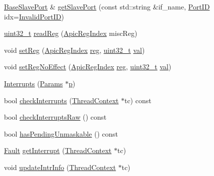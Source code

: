 \begin{DoxyCompactItemize}
\item 
\hyperlink{classBaseSlavePort}{BaseSlavePort} \& \hyperlink{classX86ISA_1_1Interrupts_a5b5b45105eb4b64567ecea56e5bc30f2}{getSlavePort} (const std::string \&if\_\-name, \hyperlink{base_2types_8hh_acef4d7d41cb21fdc252e20c04cd7bb8e}{PortID} idx=\hyperlink{base_2types_8hh_a65bf40f138cf863f0c5e2d8ca1144126}{InvalidPortID})
\item 
\hyperlink{Type_8hh_a435d1572bf3f880d55459d9805097f62}{uint32\_\-t} \hyperlink{classX86ISA_1_1Interrupts_a505f3b9c44f3e911ac16a833289d72d6}{readReg} (\hyperlink{namespaceX86ISA_aaa839fcdf6f426c03c7382fcc29ac649}{ApicRegIndex} miscReg)
\item 
void \hyperlink{classX86ISA_1_1Interrupts_af0c2ac2127c28e0a1e26b9b005e1bfa1}{setReg} (\hyperlink{namespaceX86ISA_aaa839fcdf6f426c03c7382fcc29ac649}{ApicRegIndex} \hyperlink{namespaceX86ISA_aeeb02ad833ab76f3430553ef93213a6b}{reg}, \hyperlink{Type_8hh_a435d1572bf3f880d55459d9805097f62}{uint32\_\-t} \hyperlink{namespaceX86ISA_ae13bf1250853ff6b72aabe3c79b587cc}{val})
\item 
void \hyperlink{classX86ISA_1_1Interrupts_aa35a02e092cafc6be88b0eb6afe22937}{setRegNoEffect} (\hyperlink{namespaceX86ISA_aaa839fcdf6f426c03c7382fcc29ac649}{ApicRegIndex} \hyperlink{namespaceX86ISA_aeeb02ad833ab76f3430553ef93213a6b}{reg}, \hyperlink{Type_8hh_a435d1572bf3f880d55459d9805097f62}{uint32\_\-t} \hyperlink{namespaceX86ISA_ae13bf1250853ff6b72aabe3c79b587cc}{val})
\item 
\hyperlink{classX86ISA_1_1Interrupts_a3d148759405b99148e0c34750966edb1}{Interrupts} (\hyperlink{classX86ISA_1_1Interrupts_a3c48a671abef695247afdd48259ac20a}{Params} $\ast$\hyperlink{namespaceX86ISA_af675c1d542a25b96e11164b80809a856}{p})
\item 
bool \hyperlink{classX86ISA_1_1Interrupts_af3c66fb49fec598cf78aaec29d764952}{checkInterrupts} (\hyperlink{classThreadContext}{ThreadContext} $\ast$tc) const 
\item 
bool \hyperlink{classX86ISA_1_1Interrupts_a764a42ffe59f12449457ca2373515884}{checkInterruptsRaw} () const 
\item 
bool \hyperlink{classX86ISA_1_1Interrupts_a24a3de3c5f8caba5e9aa0d5653a31f63}{hasPendingUnmaskable} () const 
\item 
\hyperlink{classRefCountingPtr}{Fault} \hyperlink{classX86ISA_1_1Interrupts_ae603c88d759977611d3bcc6e2deb61ae}{getInterrupt} (\hyperlink{classThreadContext}{ThreadContext} $\ast$tc)
\item 
void \hyperlink{classX86ISA_1_1Interrupts_a00892e9b06edcba6c3c27454d6235100}{updateIntrInfo} (\hyperlink{classThreadContext}{ThreadContext} $\ast$tc)

\end{DoxyCompactItemize}
